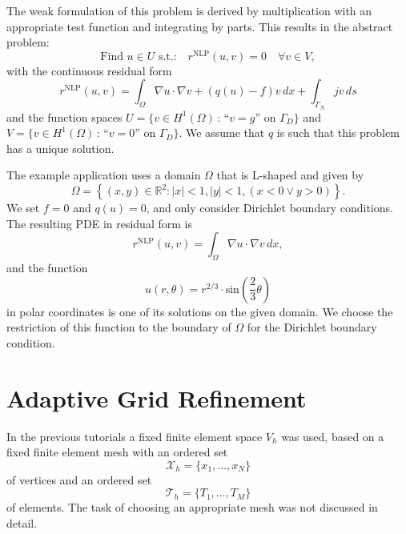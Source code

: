 \documentclass[a4paper,12pt]{article}
\begin{document}
The weak formulation of this problem is derived by multiplication with an appropriate
test function and integrating by parts. This results in the abstract problem:
\begin{equation}
\text{Find $u\in U$ s.t.:} \quad r^{\text{NLP}}(u,v)=0 \quad \forall v\in V,
\label{Eq:BasicBuildingBlock}
\end{equation}
with the continuous residual form
\begin{equation*}
r^{\text{NLP}}(u,v) = \int_\Omega \nabla u \cdot \nabla v + (q(u)-f)v\,dx + \int_{\Gamma_N} jv\,ds
\label{eq:ResidualForm}
\end{equation*}
and the function spaces
$U= \{v\in H^1(\Omega) \,:\, \text{``$v=g$'' on $\Gamma_D$}\}$
and $V= \{v\in H^1(\Omega) \,:\, \text{``$v=0$'' on $\Gamma_D$}\}$.
We assume that $q$ is such that this problem has a unique solution.

The example application uses a domain $\Omega$ that is L-shaped and given by
\begin{equation*}
  \Omega = \left\{ (x,y) \in \mathbb{R}^2 \colon |x| < 1, |y| < 1, (x < 0 \lor y > 0) \right\}.
\end{equation*}
We set $f = 0$ and $q(u) = 0$, and only consider Dirichlet boundary conditions.
The resulting PDE in residual form is
\begin{equation*}
r^{\text{NLP}}(u,v) = \int_\Omega \nabla u \cdot \nabla v \,dx,
\end{equation*}
and  the function
\begin{equation*}
  u(r,\theta) = r^{2/3} \cdot \text{sin}\left(\frac{2}{3} \theta\right)
\end{equation*}
in polar coordinates is one of its solutions on the given domain. We choose the restriction
of this function to the boundary of $\Omega$ for the Dirichlet boundary condition.

\section{Adaptive Grid Refinement} \label{Sec:AdaptiveRefinement}

In the previous tutorials a fixed finite element space $V_h$ was used, based on a fixed finite
element mesh with an ordered set
\begin{equation}
\mathcal{X}_h = \{x_1,\ldots,x_N\}
\end{equation}
of vertices and an ordered set
\begin{equation}
\mathcal{T}_h = \{T_1, \ldots, T_M\}
\end{equation}
of elements. The task of choosing an appropriate mesh was not discussed in detail.
\end{document}
